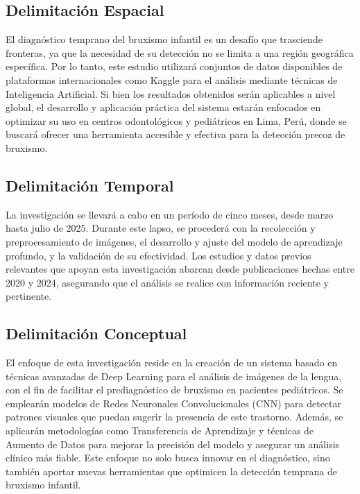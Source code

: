 \subsection{Delimitación Espacial}
El diagnóstico temprano del bruxismo infantil es un desafío que trasciende fronteras, ya que la necesidad de su detección no se limita a una región geográfica específica. Por lo tanto, este estudio utilizará conjuntos de datos disponibles de plataformas internacionales como Kaggle para el análisis mediante técnicas de Inteligencia Artificial. Si bien los resultados obtenidos serán aplicables a nivel global, el desarrollo y aplicación práctica del sistema estarán enfocados en optimizar su uso en centros odontológicos y pediátricos en Lima, Perú, donde se buscará ofrecer una herramienta accesible y efectiva para la detección precoz de bruxismo.

\subsection{Delimitación Temporal}
La investigación se llevará a cabo en un período de cinco meses, desde marzo hasta julio de 2025. Durante este lapso, se procederá con la recolección y preprocesamiento de imágenes, el desarrollo y ajuste del modelo de aprendizaje profundo, y la validación de su efectividad. Los estudios y datos previos relevantes que apoyan esta investigación abarcan desde publicaciones hechas entre 2020 y 2024, asegurando que el análisis se realice con información reciente y pertinente.

\subsection{Delimitación Conceptual}
El enfoque de esta investigación reside en la creación de un sistema basado en técnicas avanzadas de Deep Learning para el análisis de imágenes de la lengua, con el fin de facilitar el prediagnóstico de bruxismo en pacientes pediátricos. Se emplearán modelos de Redes Neuronales Convolucionales (CNN) para detectar patrones visuales que puedan sugerir la presencia de este trastorno. Además, se aplicarán metodologías como Transferencia de Aprendizaje y técnicas de Aumento de Datos para mejorar la precisión del modelo y asegurar un análisis clínico más fiable. Este enfoque no solo busca innovar en el diagnóstico, sino también aportar nuevas herramientas que optimicen la detección temprana de bruxismo infantil.